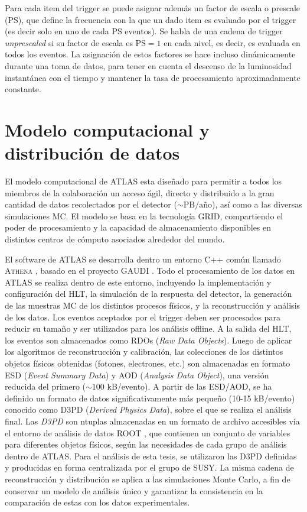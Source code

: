 Para cada item del trigger se puede asignar además
un factor de escala o prescale (PS), que define la frecuencia con la que un dado
item es evaluado por el trigger (es decir solo en uno de cada PS eventos).
Se habla de una cadena de trigger \emph{unprescaled} si su factor de escala es
$\text{PS} = 1$ en cada nivel, es decir, es evaluada en todos los eventos. La asignación de estos
factores se hace incluso dinámicamente durante una toma de datos, para tener en
cuenta el descenso de la luminosidad instantánea con el tiempo y mantener la
tasa de procesamiento aproximadamente constante.



\section{Modelo computacional y distribución de datos}

El modelo computacional de ATLAS esta diseñado para permitir a todos los
miembros de la colaboración un acceso ágil, directo y distribuido a la gran
cantidad de datos recolectados por el detector ($\sim \text{PB}/\text{a\~no}$),
así como a las diversas simulaciones MC. El modelo se basa en la tecnología
GRID, compartiendo el poder de procesamiento y la capacidad de almacenamiento
disponibles en distintos centros de cómputo asociados alrededor del mundo.

El software de ATLAS se desarrolla dentro un entorno C++ común llamado
\textsc{Athena} \cite{CompuTDR,Lenzi:1214931,Calafiura:865624}, basado en el
proyecto GAUDI \cite{Gaudi}. Todo el procesamiento de los datos en ATLAS se
realiza dentro de este entorno, incluyendo la implementación y configuración del
HLT, la simulación de la respuesta del detector, la generación de las muestras
MC de los distintos procesos físicos, y la reconstrucción y análisis de los
datos. Los eventos aceptados por el trigger deben ser procesados para reducir su
tamaño y ser utilizados para los análisis offline. A la salida del HLT, los
eventos son almacenados como RDOs (\emph{Raw Data Objects}). Luego de aplicar
los algoritmos de reconstrucción y calibración, las colecciones de los distintos
objetos físicos obtenidas (fotones, electrones, etc.) son almacenadas en formato
ESD (\emph{Event Summary Data}) y AOD (\emph{Analysis Data Object}), una versión
reducida del primero ($\sim 100$ kB/evento). A partir de las ESD/AOD, se ha
definido un formato de datos significativamente más pequeño (10-15 kB/evento)
conocido como D3PD (\emph{Derived Physics Data}), sobre el que se realiza el
análisis final. Las \emph{D3PD} son ntuplas almacenadas en un formato de archivo
accesibles vía el entorno de análisis de datos ROOT \cite{Brun199781}, que
contienen un conjunto de variables para diferentes objetos físicos, según las
necesidades de cada grupo de análisis dentro de ATLAS. Para el análisis de esta
tesis, se utilizaron las D3PD definidas y producidas en forma centralizada por
el grupo de SUSY. La misma cadena de reconstrucción y distribución se aplica a
las simulaciones Monte Carlo, a fin de conservar un modelo de análisis único y
garantizar la consistencia en la comparación de estas con los datos
experimentales.

